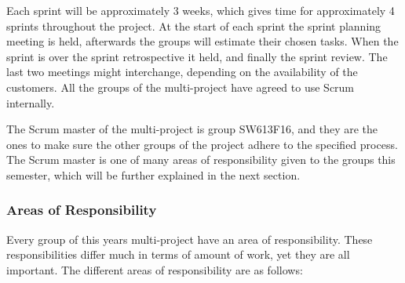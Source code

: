 Each sprint will be approximately 3 weeks, which gives time for approximately 4 sprints throughout the project.
At the start of each sprint the sprint planning meeting is held, afterwards the groups will estimate their chosen tasks.
When the sprint is over the sprint retrospective it held, and finally the sprint review.
The last two meetings might interchange, depending on the availability of the customers.
All the groups of the multi-project have agreed to use Scrum internally.

The Scrum master of the multi-project is group SW613F16, and they are the ones to make sure the other groups of the project adhere to the specified process.
The Scrum master is one of many areas of responsibility given to the groups this semester, which will be further explained in the next section.


\subsubsection*{Areas of Responsibility}
Every group of this years multi-project have an area of responsibility.
These responsibilities differ much in terms of amount of work, yet they are all important.
The different areas of responsibility are as follows:

